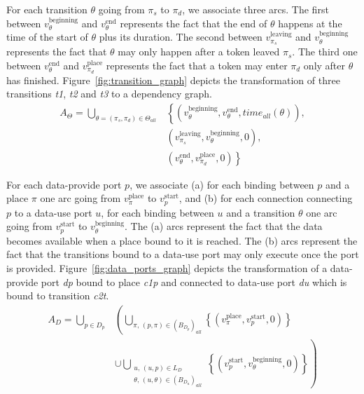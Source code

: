 For each transition $\theta$ going from $\pi_s$ to $\pi_d$, we associate
three arcs. The first between $v_\theta^\text{beginning}$ and $v_\theta^\text{end}$
represents the fact that the end of $\theta$ happens at the time of the
start of $\theta$ plus its duration. The second between $v_{\pi_{s}}^\text{leaving}$
and $v_\theta^\text{beginning}$ represents the fact that $\theta$ may only
happen after a token leaved $\pi_s$. The third one between $v_\theta^\text{end}$ and
$v_{\pi_{d}}^\text{place}$ represents the fact that a token may enter $\pi_d$ only
after $\theta$ has finished.
Figure~\ref{fig:transition_graph} depicts the transformation of three
transitions \emph{t1}, \emph{t2} and \emph{t3} to a dependency graph.
\begin{align*}
A_{\Theta}=\bigcup_{\theta=\left(\pi_{s},\pi_{d}\right)\in\Theta_{all}} & \left\{ \left(v_\theta^\text{beginning},v_\theta^\text{end},time_{all}\left(\theta\right)\right),\right.\\
 & \left(v_{\pi_{s}}^\text{leaving},v_\theta^\text{beginning},0\right),\\
 & \left. \left(v_\theta^\text{end},v_{\pi_{d}}^\text{place},0\right)\right\}
\end{align*}



For each data-provide port $p$, we associate (a) for each binding between
$p$ and a place $\pi$ one arc going from $v_\pi^\text{place}$ to
$v_p^\text{start}$, and (b) for each connection connecting $p$
to a data-use port $u$, for each binding between $u$ and a transition
$\theta$ one arc going from $v_p^\text{start}$ to $v_\theta^\text{beginning}$.
The (a) arcs represent the fact that the data becomes
available when a place bound to it is reached. The (b) arcs represent the
fact that the transitions bound to a data-use port may only execute once
the port is provided.
Figure~\ref{fig:data_ports_graph} depicts the transformation of a
data-provide port \emph{dp} bound to place \emph{c1p} and connected to
data-use port \emph{du} which is bound to transition \emph{c2t}.
\begin{align*}
A_{D}=\bigcup_{p\in D_p}
& \left(\bigcup_{\pi,\,\left(p,\pi\right)\in\left(B_{D_{p}}\right)_{all}}\left\{ \left(v_\pi^\text{place},v_p^\text{start},0\right)\right\}\right. \\
& \left.\cup\bigcup_{\substack{u,\,\left(u,p\right)\in L_D \\ \theta,\,\left(u,\theta\right)\in\left(B_{D_{u}}\right)_{all}}}\left\{ \left(v_p^\text{start},v_\theta^\text{beginning},0\right)\right\}\right)
\end{align*}

